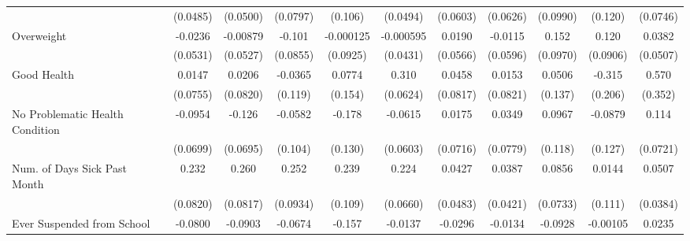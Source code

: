 {\begin{tabular}{l*{10}{c}}
            &    (0.0485)         &    (0.0500)         &    (0.0797)         &     (0.106)         &    (0.0494)         &    (0.0603)         &    (0.0626)         &    (0.0990)         &     (0.120)         &    (0.0746)         \\
\addlinespace
Overweight  &     -0.0236         &    -0.00879         &      -0.101         &   -0.000125         &   -0.000595         &      0.0190         &     -0.0115         &       0.152         &       0.120         &      0.0382         \\
            &    (0.0531)         &    (0.0527)         &    (0.0855)         &    (0.0925)         &    (0.0431)         &    (0.0566)         &    (0.0596)         &    (0.0970)         &    (0.0906)         &    (0.0507)         \\
\addlinespace
Good Health &      0.0147         &      0.0206         &     -0.0365         &      0.0774         &       0.310\sym{***}&      0.0458         &      0.0153         &      0.0506         &      -0.315         &       0.570         \\
            &    (0.0755)         &    (0.0820)         &     (0.119)         &     (0.154)         &    (0.0624)         &    (0.0817)         &    (0.0821)         &     (0.137)         &     (0.206)         &     (0.352)         \\
\addlinespace
No Problematic Health Condition&     -0.0954         &      -0.126         &     -0.0582         &      -0.178         &     -0.0615         &      0.0175         &      0.0349         &      0.0967         &     -0.0879         &       0.114         \\
            &    (0.0699)         &    (0.0695)         &     (0.104)         &     (0.130)         &    (0.0603)         &    (0.0716)         &    (0.0779)         &     (0.118)         &     (0.127)         &    (0.0721)         \\
\addlinespace
Num. of Days Sick Past Month&       0.232\sym{**} &       0.260\sym{**} &       0.252\sym{**} &       0.239\sym{*}  &       0.224\sym{***}&      0.0427         &      0.0387         &      0.0856         &      0.0144         &      0.0507         \\
            &    (0.0820)         &    (0.0817)         &    (0.0934)         &     (0.109)         &    (0.0660)         &    (0.0483)         &    (0.0421)         &    (0.0733)         &     (0.111)         &    (0.0384)         \\
\addlinespace
Ever Suspended from School&     -0.0800\sym{*}  &     -0.0903\sym{*}  &     -0.0674         &      -0.157\sym{*}  &     -0.0137         &     -0.0296         &     -0.0134         &     -0.0928         &    -0.00105         &      0.0235         \\

\end{tabular}}
